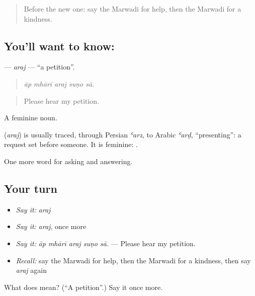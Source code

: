 \begin{quote}
Before the new one: say the Marwadi for help, then the Marwadi for a kindness.
\end{quote}

\subsection*{You'll want to know: }
\textbf{} — \emph{araj} — \textquotedblleft{}a petition\textquotedblright{}.

\begin{quote}
    
\end{quote}

\begin{quote}
\emph{āp mhārī araj suṇo sā.}
\end{quote}

\begin{quote}
Please hear my petition.
\end{quote}

A feminine noun.

\begin{cousinweb}
\textbf{} (\emph{araj}) is usually traced, through Persian \emph{ʿarz}, to Arabic \emph{ʿarḍ}, \textquotedblleft{}presenting\textquotedblright{}: a request set before someone. It is feminine: \textbf{ }.
\end{cousinweb}

\begin{grammarlens}[title={What you've built}]
One more word for asking and answering.
\end{grammarlens}

\subsection*{Your turn}
\begin{itemize}
\raggedright
  \item \emph{Say it:} \emph{araj}
  \item \emph{Say it:} \emph{araj}, once more
  \item \emph{Say it:} \emph{āp mhārī araj suṇo sā.} — Please hear my petition.
  \item \emph{Recall:} say the Marwadi for help, then the Marwadi for a kindness, then say \emph{araj} again
\end{itemize}

\begin{tcolorbox}[breakable,colback=teal!4,colframe=teal!35!black,title={Before you move on}]
What does  mean? (\textquotedblleft{}A petition\textquotedblright{}.) Say it once more.
\end{tcolorbox}
